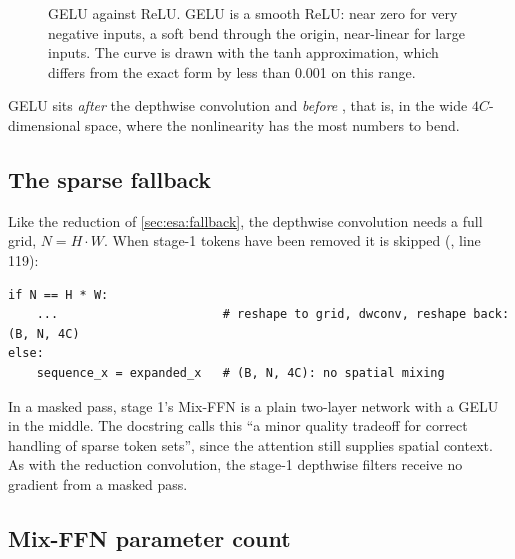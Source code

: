 \begin{figure}[htbp]
\centering
{}
\caption{GELU against ReLU. GELU is a smooth ReLU: near zero for very negative inputs, a soft bend
through the origin, near-linear for large inputs. The curve is drawn with the tanh approximation,
which differs from the exact form by less than 0.001 on this range.}
\label{fig:block:gelu}
\end{figure}

GELU sits \emph{after} the depthwise convolution and \emph{before} , that is, in the wide
$4C$-dimensional space, where the nonlinearity has the most numbers to bend.

\subsection{The sparse fallback}

Like the reduction of \cref{sec:esa:fallback}, the depthwise convolution needs a full grid,
$N = H\cdot W$. When stage-1 tokens have been removed it is skipped (, line 119):
\begin{lstlisting}
if N == H * W:
    ...                       # reshape to grid, dwconv, reshape back: (B, N, 4C)
else:
    sequence_x = expanded_x   # (B, N, 4C): no spatial mixing
\end{lstlisting}
In a masked pass, stage 1's Mix-FFN is a plain two-layer network with a GELU in the middle. The
docstring calls this ``a minor quality tradeoff for correct handling of sparse token sets'', since
the attention still supplies spatial context. As with the reduction convolution, the stage-1
depthwise filters receive no gradient from a masked pass.

\subsection{Mix-FFN parameter count}

